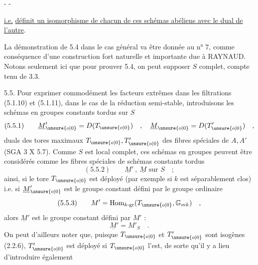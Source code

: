 \begin{center}-  -\end{center}

\uline{i.e.} \uline{définit un isomorphisme de chacun de ces schémas abéliens avec le dual de l'autre}.

La démonstration de 5.4 dans le cas général va être donnée au n° 7, comme conséquence d'une construction fort naturelle et importante due à RAYNAUD. Notons seulement ici que pour prouver 5.4, on peut supposer $S$ complet, compte tenu de 3.3.

5.5. Pour exprimer commodément les facteurs extrêmes dans les filtrations (5.1.10) et (5.1.11), dans le cas de la réduction semi-stable, introduisons les schémas en groupes constants tordus sur $S$
\[
(5.5.1)\qquad\underline M'_{\unsure{o|0}}=D(T_{\unsure{o|0}})\quad,\quad\underline M_{\unsure{o|0}}=D(T'_{\unsure{o|0}})\quad,
\]
duals des tores maximaux $T_{\unsure{o|0}},T'_{\unsure{o|0}}$ des fibres spéciales de $A,A'$ (SGA 3 X 5.7). Comme $S$ est local complet, ces schémas en groupes peuvent être considérés comme les fibres spéciales de schémas constants tordus
\[
(5.5.2)\qquad\underline M'\ ,\ \underline M\text{ sur }S\quad;
\]
ainsi, si le tore $T_{\unsure{o|0}}$ est déployé (par exemple si $k$ est séparablement clos) i.e. si $\underline M'_{\unsure{o|0}}$ est le groupe constant défini par le groupe ordinaire
\[
(5.5.3)\qquad M'=\operatorname{Hom}_{k\text{-gr}}(T_{\unsure{o|0}},\mathbb G_{mk})\quad,
\]
alors $\underline M'$ est le groupe constant défini par $M'$ :
\[
\underline M'=M'_S\quad.
\]
On peut d'ailleurs noter que, puisque $T_{\unsure{o|0}}$ et $T'_{\unsure{o|0}}$ sont isogènes (2.2.6), $T'_{\unsure{o|0}}$ est déployé si $T_{\unsure{o|0}}$ l'est, de sorte qu'il y a lieu d'introduire également
